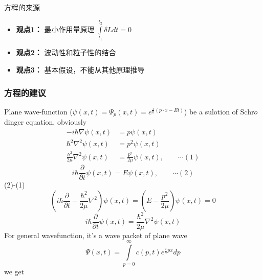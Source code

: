\begin{frame}
	\frametitle{}
	\begin{alertblock} {方程的来源}  
		\begin{itemize}
			\item 	\textbf{ 观点1：}  最小作用量原理 $\int\limits_{t_1}^{t_2} \delta L d t =0 $\\ 
			\item 	\textbf{ 观点2：}  波动性和粒子性的结合\\ 
			\item 	\textbf{ 观点3：}  基本假设，不能从其他原理推导 \\
		\end{itemize}
	\end{alertblock}
\end{frame}

\begin{frame} [allowframebreaks=]
    \frametitle{方程的建议}
    \bullet Plane wave-function ($\psi(x,t)=\Psi_p(x,t)=e^{\frac{i}{\hbar}(p\cdot x-Et)}$) be a sulotion of Schr$\ddot{o}$dinger equation, obviously
    \begin{equation*}
        \begin{split}
       -i\hbar \nabla \psi(x,t) &=p\psi(x,t) \\
       \hbar^2 \nabla^2 \psi(x,t) &=p^2\psi(x,t) \\
       \frac{\hbar^2}{2\mu} \nabla^2 \psi(x,t) &=\frac{p^2}{2\mu} \psi(x,t) , \qquad \cdots (1)
        \end{split}
    \end{equation*}
    \begin{equation*}
       i\hbar \frac{\partial }{\partial t} \psi(x,t) =E\psi(x,t)  , \qquad \cdots (2)
     \end{equation*}
    (2)-(1)
    \begin{equation*}
        (i\hbar \frac{\partial }{\partial t} - \frac{\hbar^2}{2\mu} \nabla^2 )\psi(x,t) =(E-\frac{p^2}{2\mu})\psi(x,t)=0  
    \end{equation*}
    \begin{equation*}
        i\hbar \frac{\partial }{\partial t} \psi(x,t) = \frac{\hbar^2}{2\mu} \nabla^2 \psi(x,t)
    \end{equation*}
    For general wavefunction, it's a wave packet of plane wave
    \begin{equation*}
        \Psi(x,t)= \int\limits_{p=0} ^{\infty} c(p,t) e^{\frac{i}{\hbar}px}dp
    \end{equation*}
    we get 
    \begin{equation*}

\end{equation*}
\end{frame}
